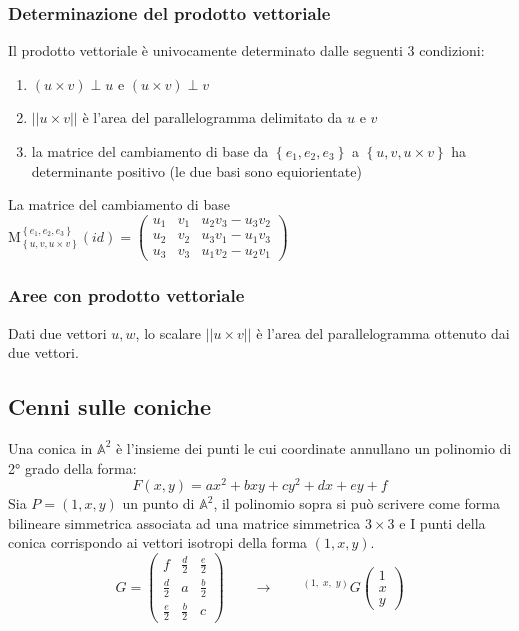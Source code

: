 \documentclass[a4paper]{article}
\begin{document}
\subsubsection*{Determinazione del prodotto vettoriale}
Il prodotto vettoriale è univocamente determinato dalle seguenti 3 condizioni:
\begin{enumerate}
	\item \((u \times v) \perp u\) e \((u \times v) \perp v\)
	\item \(|| u \times v ||\) è l'area del parallelogramma delimitato da \(u\) e \(v\)
	\item la matrice del cambiamento di base da \(\left\{ e_1, e_2, e_3 \right\}\) a \(\left\{ u, v, u \times v \right\}\) ha
	determinante positivo (le due basi sono equiorientate)
\end{enumerate}
La matrice del cambiamento di base \(\text{M}_{\left\{ u, v, u \times v \right\}}^{\left\{ e_1, e_2, e_3 \right\}}(id) = \left( \begin{matrix}
	u_1 & v_1 & u_2 v_3 - u_3 v_2 \\
	u_2 & v_2 & u_3 v_1 - u_1 v_3 \\
	u_3 & v_3 & u_1 v_2 - u_2 v_1
\end{matrix} \right)\)

\subsubsection*{Aree con prodotto vettoriale}
Dati due vettori \(u, w\), lo scalare \(|| u \times v ||\) è l'area del parallelogramma ottenuto dai due vettori.

\newpage

\subsection{Cenni sulle coniche}
Una conica in \(\mathbb{A}^2\) è l'insieme dei punti le cui coordinate annullano un polinomio di 2° grado della forma:
\[F(x,y) = ax^2 + bxy + cy^2 + dx + ey + f\]
Sia \(P = (1, x, y)\) un punto di \(\mathbb{A}^2\), il polinomio sopra si può scrivere come forma bilineare simmetrica associata
ad una matrice simmetrica \(3 \times 3\) e I punti della conica corrispondo ai vettori isotropi della forma \((1, x, y)\).
\[G = \left( \begin{matrix}f & \frac{d}{2} & \frac{e}{2} \\ \frac{d}{2} & a & \frac{b}{2} \\ \frac{e}{2} & \frac{b}{2} & c \end{matrix} \right)
\qquad \longrightarrow \qquad ^{\displaystyle(1, \; x, \; y)} G \left( \begin{matrix} 1 \\ x \\ y \end{matrix} \right) \]
\end{document}
